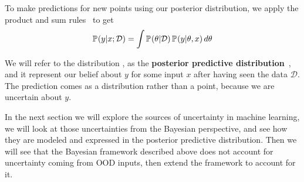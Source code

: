 To make predictions for new points using our posterior distribution, we apply the product and sum rules~\citep{mackay2003information} to get
\begin{equation}
    \label{eq:bayesian_predictive}
    \mathbb{P}_{}(y|x; \mathcal{D})=  \int \mathbb{P}_{}(\theta | \mathcal{D})\, \mathbb{P}_{}(y|\theta, x) \, d\theta
\end{equation}{}

We will refer to the distribution , as the \textbf{posterior predictive distribution}~\citep{barbieri2014posterior}, and it represent our belief about $y$ for some input $x$ after having seen the data $\mathcal{D}$. The prediction comes as a distribution rather than a point, because we are uncertain about $y$. 

In the next section we will explore the sources of uncertainty in machine learning, we will look at those uncertainties from the Bayesian perspective, and see how they are modeled and expressed in the posterior predictive distribution. Then we will see that the Bayesian framework described above does not account for uncertainty coming from OOD inputs, then extend the framework to account for it. 






